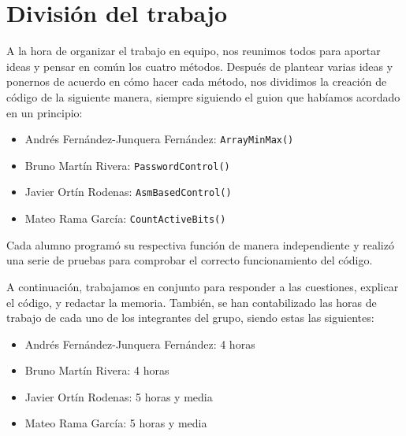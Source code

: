 \documentclass[11pt,a4paper]{article}
\begin{document}
\newpage

\section{División del trabajo}
A la hora de organizar el trabajo en equipo, nos reunimos todos para aportar ideas y
pensar en común los cuatro métodos. Después de plantear varias ideas y ponernos de acuerdo 
en cómo hacer cada método, nos dividimos la creación de código de la siguiente manera, siempre 
siguiendo el guion que habíamos acordado en un principio:
\begin{itemize}
  \item Andrés Fernández-Junquera Fernández: \texttt{ArrayMinMax()}
  \item Bruno Martín Rivera: \texttt{PasswordControl()}
  \item Javier Ortín Rodenas: \texttt{AsmBasedControl()}
  \item Mateo Rama García: \texttt{CountActiveBits()}
\end{itemize}

\indent Cada alumno programó su respectiva función de manera independiente y realizó una serie de pruebas para comprobar
el correcto funcionamiento del código. 
\vspace{2ex}

A continuación, trabajamos en conjunto para responder a las cuestiones, explicar el código, y redactar la memoria. También, 
se han contabilizado las horas de trabajo de cada uno de los integrantes del grupo, siendo estas las siguientes:
\begin{itemize}
  \item Andrés Fernández-Junquera Fernández: 4 horas
  \item Bruno Martín Rivera: 4 horas
  \item Javier Ortín Rodenas: 5 horas y media
  \item Mateo Rama García: 5 horas y media
\end{itemize}
\end{document}

